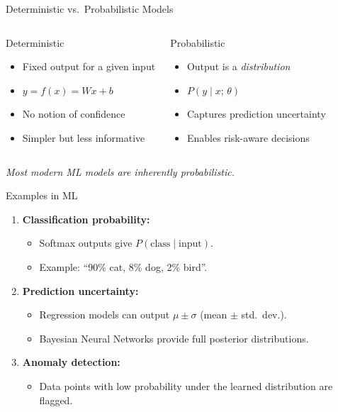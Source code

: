 \begin{frame}{Deterministic vs.\ Probabilistic Models}
\begin{columns}[T]
\begin{block}{Deterministic}
\begin{itemize}
    \item Fixed output for a given input
    \item $y = f(x) = Wx + b$
    \item No notion of confidence
    \item Simpler but less informative
\end{itemize}
\end{block}
\begin{block}{Probabilistic}
\begin{itemize}
    \item Output is a \emph{distribution}
    \item $P(y \mid x;\, \theta)$
    \item Captures prediction uncertainty
    \item Enables risk-aware decisions
\end{itemize}
\end{block}
\end{columns}
\vspace{6pt}
\centering
\textit{Most modern ML models are inherently probabilistic.}
\end{frame}

\begin{frame}{Examples in ML}
\begin{enumerate}
    \item \textbf{Classification probability:}
    \begin{itemize}
        \item Softmax outputs give $P(\text{class}\mid\text{input})$.
        \item Example: ``90\% cat, 8\% dog, 2\% bird''.
    \end{itemize}
    \item \textbf{Prediction uncertainty:}
    \begin{itemize}
        \item Regression models can output $\mu \pm \sigma$ (mean $\pm$ std.\ dev.).
        \item Bayesian Neural Networks provide full posterior distributions.
    \end{itemize}
    \item \textbf{Anomaly detection:}
    \begin{itemize}
        \item Data points with low probability under the learned distribution are flagged.
    \end{itemize}
\end{enumerate}
\end{frame}

